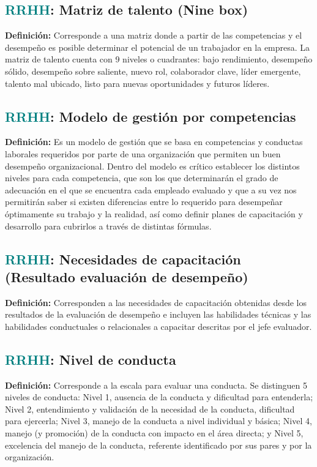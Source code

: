 \documentclass[12pt]{article}
\begin{document}
\subsection{\textcolor{teal}{RRHH}: Matriz de talento (Nine box)}
\textbf{Definición:} Corresponde a una matriz donde a partir de las competencias y el desempeño es posible determinar el potencial de un trabajador en la empresa. La matriz de talento cuenta con 9 niveles o cuadrantes: bajo rendimiento, desempeño sólido, desempeño sobre saliente, nuevo rol, colaborador clave, líder emergente, talento mal ubicado, listo para nuevas oportunidades y futuros líderes.
\subsection{\textcolor{teal}{RRHH}: Modelo de gestión por competencias}
\textbf{Definición:} Es un modelo de gestión que se basa en competencias y conductas laborales requeridos por parte de una organización que permiten un buen desempeño organizacional.
Dentro del modelo es crítico establecer los distintos niveles para cada competencia, que son los que determinarán el grado de adecuación en el que se encuentra cada empleado evaluado y que a su vez nos permitirán saber si existen diferencias entre lo requerido para desempeñar óptimamente su trabajo y la realidad, así como definir planes de capacitación y desarrollo para cubrirlos a través de distintas fórmulas.
\subsection{\textcolor{teal}{RRHH}: Necesidades de capacitación (Resultado evaluación de desempeño)}
\textbf{Definición:} Corresponden a las necesidades de capacitación obtenidas desde los resultados de la evaluación de desempeño e incluyen las habilidades técnicas y las habilidades conductuales o relacionales a capacitar descritas por el jefe evaluador.
\subsection{\textcolor{teal}{RRHH}: Nivel de conducta}
\textbf{Definición:} Corresponde a la escala para evaluar una conducta. Se distinguen 5 niveles de conducta: 
Nivel 1, ausencia de la conducta y dificultad para entenderla;
Nivel 2, entendimiento y validación de la necesidad de la conducta, dificultad para ejercerla; 
Nivel 3, manejo de la conducta a nivel individual y básica; 
Nivel 4, manejo (y promoción) de la conducta con impacto en el área directa; 
y Nivel 5, excelencia del manejo de la conducta, referente identificado por sus pares y por la organización.
\end{document}
